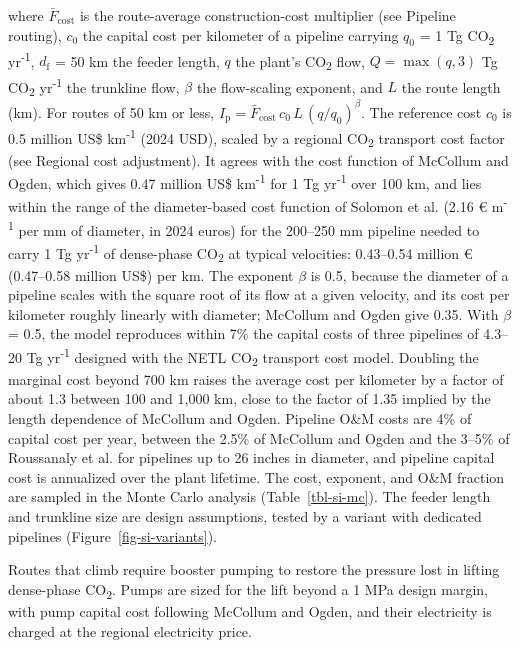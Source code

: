 \documentclass[
  letterpaper,
  twoside,
  twocolumn,
  9pt]{article}
\begin{document}
where \(\bar{F}_{\mathrm{cost}}\) is the route-average construction-cost
multiplier (see Pipeline routing), \(c_0\) the capital cost per
kilometer of a pipeline carrying \(q_0\) = 1 Tg CO\textsubscript{2}
yr\textsuperscript{-1}, \(d_{\mathrm{f}}\) = 50 km the feeder length,
\(q\) the plant's CO\textsubscript{2} flow, \(Q = \max(q, 3)\) Tg
CO\textsubscript{2} yr\textsuperscript{-1} the trunkline flow, \(\beta\)
the flow-scaling exponent, and \(L\) the route length (km). For routes
of 50 km or less,
\(I_{\mathrm{p}} = \bar{F}_{\mathrm{cost}}\, c_0\, L\, (q/q_0)^{\beta}\).
The reference cost \(c_0\) is 0.5 million US\$ km\textsuperscript{-1}
(2024 USD), scaled by a regional CO\textsubscript{2} transport cost
factor (see Regional cost adjustment). It agrees with the cost function
of McCollum and Ogden\citep{mccollum2006}, which gives 0.47 million US\$
km\textsuperscript{-1} for 1 Tg yr\textsuperscript{-1} over 100 km, and
lies within the range of the diameter-based cost function of Solomon et
al.\citep{solomon2024} (2.16 € m\textsuperscript{-1} per mm of diameter,
in 2024 euros) for the 200--250 mm pipeline needed to carry 1 Tg
yr\textsuperscript{-1} of dense-phase CO\textsubscript{2} at typical
velocities: 0.43--0.54 million € (0.47--0.58 million US\$) per km. The
exponent \(\beta\) is 0.5, because the diameter of a pipeline scales
with the square root of its flow at a given velocity, and its cost per
kilometer roughly linearly with diameter;\citep{solomon2024} McCollum
and Ogden\citep{mccollum2006} give 0.35. With \(\beta\) = 0.5, the model
reproduces within 7\% the capital costs of three pipelines of 4.3--20 Tg
yr\textsuperscript{-1} designed with the NETL CO\textsubscript{2}
transport cost model.\citep{warmack2022} Doubling the marginal cost
beyond 700 km raises the average cost per kilometer by a factor of about
1.3 between 100 and 1,000 km, close to the factor of 1.35 implied by the
length dependence of McCollum and Ogden\citep{mccollum2006}. Pipeline
O\&M costs are 4\% of capital cost per year, between the 2.5\% of
McCollum and Ogden\citep{mccollum2006} and the 3--5\% of Roussanaly et
al.\citep{roussanaly2013} for pipelines up to 26 inches in diameter, and
pipeline capital cost is annualized over the plant lifetime. The cost,
exponent, and O\&M fraction are sampled in the Monte Carlo analysis
(Table~\ref{tbl-si-mc}). The feeder length and trunkline size are design
assumptions, tested by a variant with dedicated pipelines
(Figure~\ref{fig-si-variants}).

Routes that climb require booster pumping to restore the pressure lost
in lifting dense-phase CO\textsubscript{2}. Pumps are sized for the lift
beyond a 1 MPa design margin, with pump capital cost following McCollum
and Ogden\citep{mccollum2006}, and their electricity is charged at the
regional electricity price.
\end{document}
